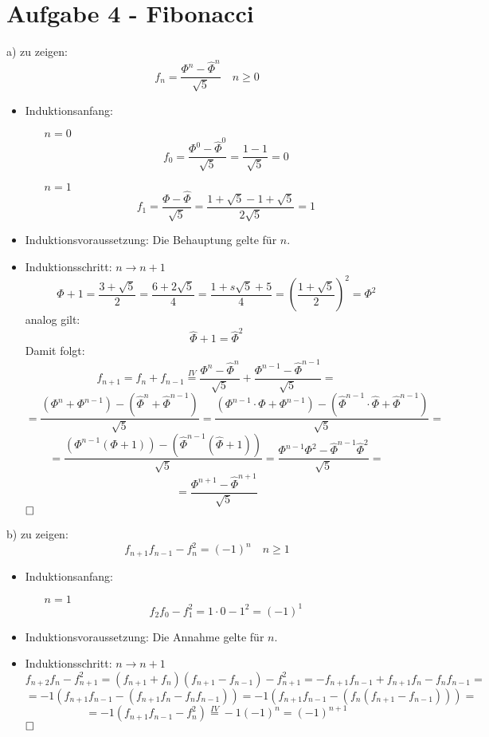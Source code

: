 \section*{Aufgabe 4 - Fibonacci}
\begin{paragraph}{a)}
  zu zeigen:
  \[ f_n = \frac{\Phi^n - \hat \Phi^n}{\sqrt{5}} \quad n \geq 0 \]
  \begin{itemize}
    \item Induktionsanfang:
    \begin{itemize}
      \item[$n = 0$]
        \[ f_0 = \frac{\Phi^0 - \hat \Phi^0}{\sqrt{5}} 
               = \frac{1 - 1}{\sqrt{5}} = 0 \]
      \item[$n = 1$]
        \[ f_1 = \frac{\Phi - \hat \Phi}{\sqrt{5}} 
               = \frac{1 + \sqrt{5} - 1 + \sqrt{5}}{2 \sqrt{5}} = 1 \]
    \end{itemize}
    \item Induktionsvoraussetzung: Die Behauptung gelte für $n$.
    \item Induktionsschritt: $n \rightarrow n + 1$
    \[ \Phi + 1 = \frac{3 + \sqrt{5}}{2} = \frac{6 + 2 \sqrt{5}}{4} 
                = \frac{1 + s \sqrt{5} + 5}{4} = (\frac{1 + \sqrt{5}}{2})^2 
                = \Phi^2 \]
    analog gilt:
    \[ \hat \Phi + 1 = \hat \Phi^2 \]
    Damit folgt:
    \[ f_{n+1} = f_n + f_{n-1} \overset{IV}{=} \frac{\Phi^n - \hat
       \Phi^n}{\sqrt{5}} + \frac{\Phi^{n-1} - \hat \Phi^{n-1}}{\sqrt{5}} = \]
    \[ = \frac{(\Phi^n + \Phi^{n-1}) - (\hat \Phi^n + \hat \Phi^{n-1})}{\sqrt{5}}
       = \frac{(\Phi^{n-1} \cdot \Phi + \Phi^{n-1}) - 
         (\hat \Phi^{n-1} \cdot \hat \Phi + \hat \Phi^{n-1})}{\sqrt{5}} = \]
    \[ = \frac{(\Phi^{n-1} (\Phi + 1)) - (\hat \Phi^{n-1} (\hat \Phi + 1))}{\sqrt{5}} 
       = \frac{\Phi^{n-1} \Phi^2 - \hat \Phi^{n-1} \hat \Phi^2}{\sqrt{5}} = \]
    \[ = \frac{\Phi^{n+1} - \hat \Phi^{n+1}}{\sqrt{5}} \]
    $\hfill \square$
  \end{itemize}
\end{paragraph}
\begin{paragraph}{b)}
  zu zeigen:
  \[ f_{n+1} f_{n-1} - f_n^2 = (-1)^n \quad n \geq 1 \]
  \begin{itemize}
    \item Induktionsanfang:
    \begin{itemize}
      \item[$n = 1$] \[ f_2f_0 - f_1^2 = 1 \cdot 0 - 1^2 = (-1)^1 \]
    \end{itemize}
    \item Induktionsvoraussetzung: Die Annahme gelte für $n$.
    \item Induktionsschritt: $n \rightarrow n + 1$
    \[ f_{n+2}f_n - f_{n+1}^2 = (f_{n+1} + f_n)(f_{n+1} - f_{n-1}) - f_{n+1}^2
                              = -f_{n+1}f_{n-1} + f_{n+1}f_n - f_nf_{n-1} = \]
    \[ = -1(f_{n+1}f_{n-1} - (f_{n+1}f_n - f_nf_{n-1})) 
       = -1(f_{n+1}f_{n-1} - (f_n(f_{n+1} - f_{n-1}))) = \]
    \[ = -1(f_{n+1}f_{n-1} - f_n^2) \overset{IV}{=} -1(-1)^n = (-1)^{n+1} \]
    $\hfill \square$
  \end{itemize}
\end{paragraph}
